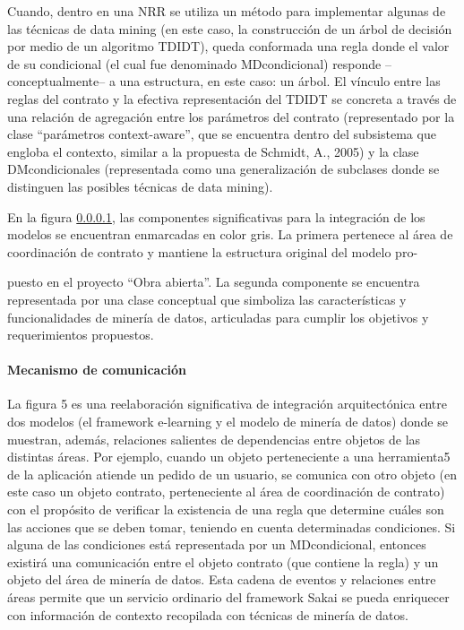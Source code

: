 \begin{itemize}
Cuando, dentro en una NRR se utiliza un método para implementar
algunas de las técnicas de data mining (en este caso, la construcción de un
árbol de decisión por medio de un algoritmo TDIDT), queda conformada una
regla donde el valor de su condicional (el cual fue denominado MDcondicional)
responde –conceptualmente– a una estructura, en este caso: un árbol.
El vínculo entre las reglas del contrato y la efectiva representación del TDIDT
se concreta a través de una relación de agregación entre los parámetros del
contrato (representado por la clase “parámetros context-aware”, que se encuentra
dentro del subsistema que engloba el contexto, similar a la propuesta de
Schmidt, A., 2005) y la clase DMcondicionales (representada como una
generalización de subclases donde se distinguen las posibles técnicas de data
mining).

En la figura \ref{}, las componentes significativas para la integración de los
modelos se encuentran enmarcadas en color gris. La primera pertenece al área
de coordinación de contrato y mantiene la estructura original del modelo pro-

puesto en el proyecto “Obra abierta”. La segunda componente se encuentra
representada por una clase conceptual que simboliza las características y funcionalidades
de minería de datos, articuladas para cumplir los objetivos y
requerimientos propuestos.

\paragraph{Mecanismo de comunicación}

La figura 5 es una reelaboración significativa de integración arquitectónica
entre dos modelos (el framework e-learning y el modelo de minería de datos)
donde se muestran, además, relaciones salientes de dependencias entre objetos
de las distintas áreas. Por ejemplo, cuando un objeto perteneciente a una
herramienta5 de la aplicación atiende un pedido de un usuario, se comunica
con otro objeto (en este caso un objeto contrato, perteneciente al área de
coordinación de contrato) con el propósito de verificar la existencia de una
regla que determine cuáles son las acciones que se deben tomar, teniendo en
cuenta determinadas condiciones. Si alguna de las condiciones está representada
por un MDcondicional, entonces existirá una comunicación entre el
objeto contrato (que contiene la regla) y un objeto del área de minería de
datos. Esta cadena de eventos y relaciones entre áreas permite que un servicio
ordinario del framework Sakai se pueda enriquecer con información de contexto
recopilada con técnicas de minería de datos.


\end{itemize}
